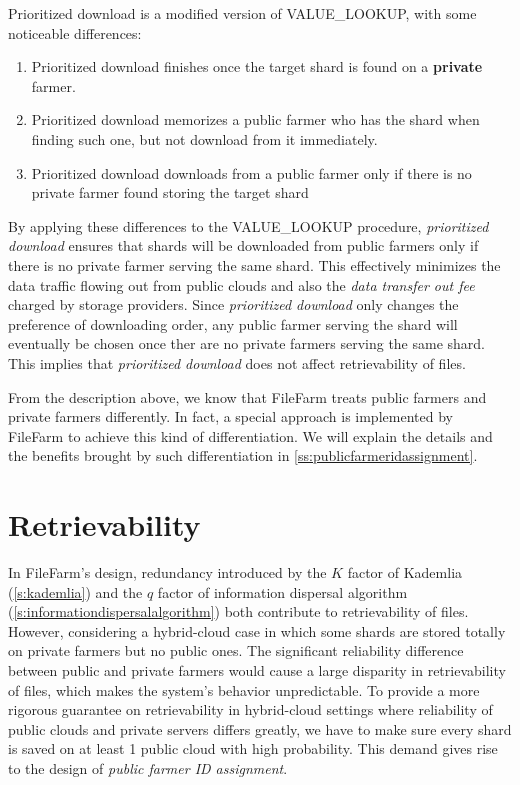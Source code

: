 Prioritized download is a modified version of VALUE\_LOOKUP, with some noticeable differences:

\begin{enumerate}
  \item Prioritized download finishes once the target shard is found on a \textbf{private} farmer.
  \item Prioritized download memorizes a public farmer who has the shard when finding such one, but not download from it immediately.
  \item Prioritized download downloads from a public farmer only if there is no private farmer found storing the target shard
\end{enumerate}

By applying these differences to the VALUE\_LOOKUP procedure, \textit{prioritized download} ensures that shards will be downloaded from public farmers only if there is no private farmer serving the same shard. This effectively minimizes the data traffic flowing out from public clouds and also the \textit{data transfer out fee} charged by storage providers. Since \textit{prioritized download} only changes the preference of downloading order, any public farmer serving the shard will eventually be chosen once ther are no private farmers serving the same shard. This implies that \textit{prioritized download} does not affect retrievability of files.

From the description above, we know that FileFarm treats public farmers and private farmers differently. In fact, a special approach is implemented by FileFarm to achieve this kind of differentiation. We will explain the details and the benefits brought by such differentiation in \ref{ss:publicfarmeridassignment}.

\section{Retrievability}
\label{s:retrievability}

In FileFarm's design, redundancy introduced by the $K$ factor of Kademlia (\ref{s:kademlia}) and the $q$ factor of information dispersal algorithm (\ref{s:informationdispersalalgorithm}) both contribute to retrievability of files. However, considering a hybrid-cloud case in which some shards are stored totally on private farmers but no public ones. The significant reliability difference between public and private farmers would cause a large disparity in retrievability of files, which makes the system's behavior unpredictable. To provide a more rigorous guarantee on retrievability in hybrid-cloud settings where reliability of public clouds and private servers differs greatly, we have to make sure every shard is saved on at least 1 public cloud with high probability. This demand gives rise to the design of \textit{public farmer ID assignment}.

